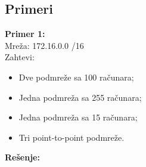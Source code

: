 \subsection{Primeri}
\large{\textbf{Primer 1:}}\\
Mreža: 172.16.0.0 /16\\
Zahtevi:
\begin{itemize}
    \item Dve podmreže sa 100 računara;
    \item Jedna podmreža sa 255 računara;
    \item Jedna podmreža sa 15 računara;
    \item Tri point-to-point podmreže.
\end{itemize}

\vspace{12px}

\textbf{Rešenje:}\\

